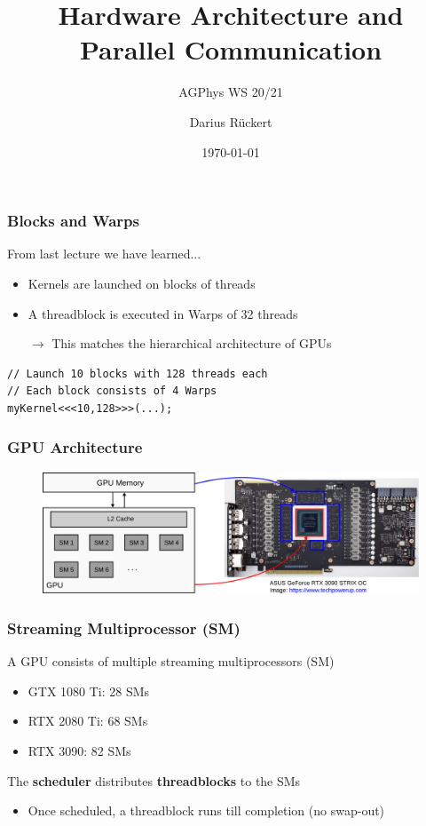 \documentclass[aspectratio=169,handout]{beamer}
\subtitle{AGPhys WS 20/21}
\title{Hardware Architecture and Parallel Communication}
\author[Darius Rückert]{Darius Rückert}
\date{\today}
\begin{document}
\frame
{
	\titlepage
}


\begin{frame}[fragile]
	\frametitle{Blocks and Warps}
	From last lecture we have learned...
	\begin{itemize}
		\item Kernels are launched on blocks of threads
		\item A threadblock is executed in Warps of 32 threads
		\item [$\rightarrow$] This matches the hierarchical architecture of GPUs
	\end{itemize}
	
\begin{lstlisting}
// Launch 10 blocks with 128 threads each
// Each block consists of 4 Warps
myKernel<<<10,128>>>(...);
\end{lstlisting}
	
\end{frame}

\frame
{
	\frametitle{GPU Architecture}
	\begin{figure}
		\includegraphics[width=1.0\textwidth]{arch}
	\end{figure}
}

\begin{frame}[fragile]
	\frametitle{Streaming Multiprocessor (SM)}
	A GPU consists of multiple streaming multiprocessors (SM)
	\begin{itemize}
		\item GTX 1080 Ti: 28 SMs
		\item RTX 2080 Ti: 68 SMs
		\item RTX 3090: 82 SMs
	\end{itemize}
	The \textbf{scheduler} distributes \textbf{threadblocks} to the SMs
		\begin{itemize}
			\item Once scheduled, a threadblock runs till completion (no swap-out)
		\end{itemize}
\end{frame}
\end{document}
